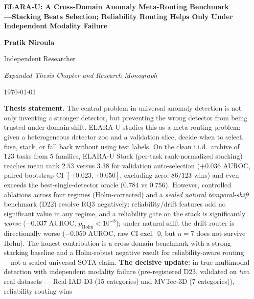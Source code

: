\documentclass[11pt,titlepage]{article}
\newcommand{\systemu}{ELARA-U}
\begin{document}
\begin{titlepage}
\centering
\vspace*{1.7cm}
{\huge\bfseries ELARA-U: A Cross-Domain Anomaly Meta-Routing Benchmark\\ ---Stacking Beats Selection; Reliability Routing Helps Only Under Independent Modality Failure\par}
\vspace{1.4cm}
{\large\bfseries Pratik Niroula}\par
\vspace{0.4cm}
{\large Independent Researcher}\par
\vspace{1.8cm}
{\Large\itshape Expanded Thesis Chapter and Research Monograph\par}
\vspace{1.5cm}
{\large \today\par}
\vspace{1.6cm}
\begin{minipage}{0.86\linewidth}
\small
\textbf{Thesis statement.} The central problem in universal anomaly detection is
not only inventing a stronger detector, but preventing the wrong detector from
being trusted under domain shift. \systemu{} studies this as a meta-routing
problem: given a heterogeneous detector zoo and a validation slice, decide when
to select, fuse, stack, or fall back without using test labels. On the clean i.i.d.\ archive of
$123$ tasks from $5$ families, \systemu{} Stack (per-task rank-normalized
stacking) reaches mean rank $2.53$ versus $3.38$ for validation auto-selection
($+0.036$ AUROC, paired-bootstrap CI $[+0.023,+0.050]$, excluding zero; $86/123$
wins) and even exceeds the best-single-detector oracle ($0.784$ vs $0.756$). However,
controlled ablations across four regimes (Holm-corrected) and a \emph{sealed natural
temporal-shift} benchmark (D22) resolve RQ3 negatively: reliability/drift features add
no significant value in any regime, and a reliability gate on the stack is significantly
\emph{worse} ($-0.037$ AUROC, $p_{\mathrm{Holm}}{<}10^{-8}$); under natural shift the
drift router is directionally worse ($-0.050$ AUROC, raw CI excl.\ $0$, but $n{=}7$ does
not survive Holm). The honest contribution is a cross-domain benchmark with a strong
stacking baseline and a Holm-robust negative result for reliability-aware
routing---not a sealed universal SOTA claim.
\textbf{The decisive update:} in true multimodal detection with independent
modality failure (pre-registered D23, validated on \emph{two} real datasets ---
Real-IAD-D3 (15 categories) and MVTec-3D (7 categories)), reliability routing wins

\end{minipage}
\end{titlepage}
\end{document}

